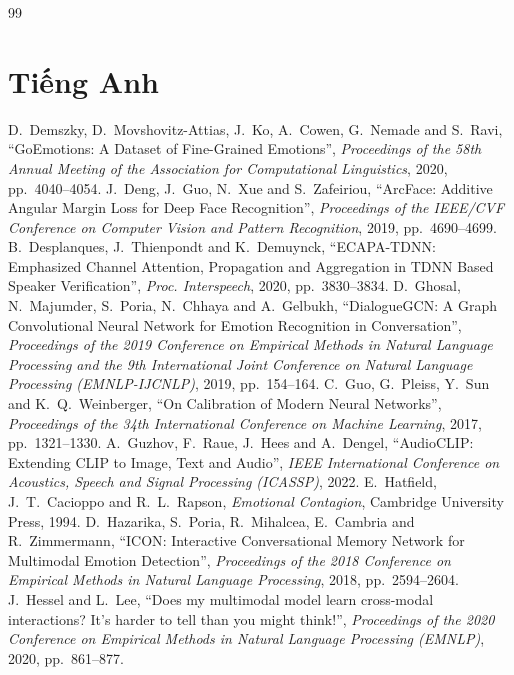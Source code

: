 \begin{thebibliography}{99}
\section*{Tiếng Anh}
 D.~Demszky, D.~Movshovitz-Attias, J.~Ko, A.~Cowen, G.~Nemade and S.~Ravi, ``{GoEmotions}: A Dataset of Fine-Grained Emotions'', \emph{Proceedings of the 58th Annual Meeting of the Association for Computational Linguistics}, 2020, pp.~4040--4054.
 J.~Deng, J.~Guo, N.~Xue and S.~Zafeiriou, ``{ArcFace}: Additive Angular Margin Loss for Deep Face Recognition'', \emph{Proceedings of the IEEE/CVF Conference on Computer Vision and Pattern Recognition}, 2019, pp.~4690--4699.
 B.~Desplanques, J.~Thienpondt and K.~Demuynck, ``{ECAPA-TDNN}: Emphasized Channel Attention, Propagation and Aggregation in {TDNN} Based Speaker Verification'', \emph{Proc. Interspeech}, 2020, pp.~3830--3834.
 D.~Ghosal, N.~Majumder, S.~Poria, N.~Chhaya and A.~Gelbukh, ``{DialogueGCN}: A Graph Convolutional Neural Network for Emotion Recognition in Conversation'', \emph{Proceedings of the 2019 Conference on Empirical Methods in Natural Language Processing and the 9th International Joint Conference on Natural Language Processing (EMNLP-IJCNLP)}, 2019, pp.~154--164.
 C.~Guo, G.~Pleiss, Y.~Sun and K.~Q.~Weinberger, ``On Calibration of Modern Neural Networks'', \emph{Proceedings of the 34th International Conference on Machine Learning}, 2017, pp.~1321--1330.
 A.~Guzhov, F.~Raue, J.~Hees and A.~Dengel, ``{AudioCLIP}: Extending {CLIP} to Image, Text and Audio'', \emph{IEEE International Conference on Acoustics, Speech and Signal Processing (ICASSP)}, 2022.
 E.~Hatfield, J.~T.~Cacioppo and R.~L.~Rapson, \emph{Emotional Contagion}, Cambridge University Press, 1994.
 D.~Hazarika, S.~Poria, R.~Mihalcea, E.~Cambria and R.~Zimmermann, ``{ICON}: Interactive Conversational Memory Network for Multimodal Emotion Detection'', \emph{Proceedings of the 2018 Conference on Empirical Methods in Natural Language Processing}, 2018, pp.~2594--2604.
 J.~Hessel and L.~Lee, ``Does my multimodal model learn cross-modal interactions? It's harder to tell than you might think!'', \emph{Proceedings of the 2020 Conference on Empirical Methods in Natural Language Processing (EMNLP)}, 2020, pp.~861--877.

\end{thebibliography}
